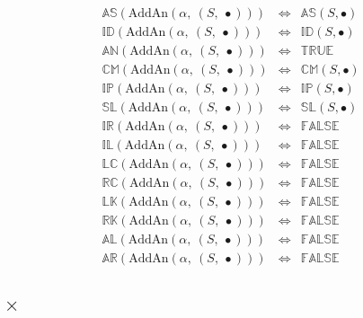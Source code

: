 \documentclass[10pt]{article}
\newcommand{\propname}[1]{{\mathbb{#1}}}
\begin{document}
\[
\begin{array}{rcl} 
\propname{AS}(\mathrm{AddAn}(\alpha,\ (S,\ \bullet))) 
  & \Leftrightarrow %
  & \propname{AS}(S, \bullet) \\
\propname{ID}(\mathrm{AddAn}(\alpha,\ (S,\ \bullet))) 
  & \Leftrightarrow %
  & \propname{ID}(S, \bullet) \\
\propname{AN}(\mathrm{AddAn}(\alpha,\ (S,\ \bullet))) 
  & \Leftrightarrow %
  & \propname{TRUE} \\ 
\propname{CM}(\mathrm{AddAn}(\alpha,\ (S,\ \bullet))) 
  & \Leftrightarrow %
  & \propname{CM}(S, \bullet) \\
\propname{IP}(\mathrm{AddAn}(\alpha,\ (S,\ \bullet))) 
  & \Leftrightarrow %
  & \propname{IP}(S, \bullet) \\
\propname{SL}(\mathrm{AddAn}(\alpha,\ (S,\ \bullet))) 
  & \Leftrightarrow %
  & \propname{SL}(S, \bullet) \\
\propname{IR}(\mathrm{AddAn}(\alpha,\ (S,\ \bullet))) 
  & \Leftrightarrow %
  & \propname{FALSE}\\ 
\propname{IL}(\mathrm{AddAn}(\alpha,\ (S,\ \bullet))) 
  & \Leftrightarrow %
  & \propname{FALSE}\\ 
\propname{LC}(\mathrm{AddAn}(\alpha,\ (S,\ \bullet))) 
  & \Leftrightarrow %
  & \propname{FALSE}\\ 
\propname{RC}(\mathrm{AddAn}(\alpha,\ (S,\ \bullet))) 
  & \Leftrightarrow %
  & \propname{FALSE}\\ 
\propname{LK}(\mathrm{AddAn}(\alpha,\ (S,\ \bullet))) 
  & \Leftrightarrow %
  & \propname{FALSE}\\ 
\propname{RK}(\mathrm{AddAn}(\alpha,\ (S,\ \bullet))) 
  & \Leftrightarrow %
  & \propname{FALSE}\\ 
\propname{AL}(\mathrm{AddAn}(\alpha,\ (S,\ \bullet))) 
  & \Leftrightarrow %
  & \propname{FALSE}\\ 
\propname{AR}(\mathrm{AddAn}(\alpha,\ (S,\ \bullet))) 
  & \Leftrightarrow %
  & \propname{FALSE}\\ 
\end{array} 
\] 

\subsection{$\times$} 
\end{document}
